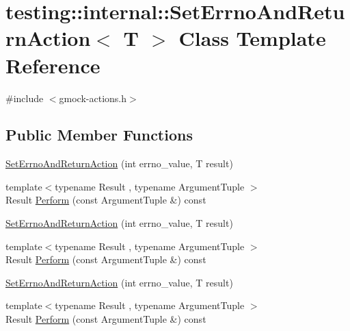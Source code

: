 \hypertarget{classtesting_1_1internal_1_1_set_errno_and_return_action}{}\section{testing\+::internal\+::Set\+Errno\+And\+Return\+Action$<$ T $>$ Class Template Reference}
\label{classtesting_1_1internal_1_1_set_errno_and_return_action}


{\ttfamily \#include $<$gmock-\/actions.\+h$>$}

\subsection*{Public Member Functions}
\begin{DoxyCompactItemize}
\item 
\mbox{\hyperlink{classtesting_1_1internal_1_1_set_errno_and_return_action_abfe5a194a9b8f2b303c635ad99b3a257}{Set\+Errno\+And\+Return\+Action}} (int errno\+\_\+value, T result)
\item 
{\footnotesize template$<$typename Result , typename Argument\+Tuple $>$ }\\Result \mbox{\hyperlink{classtesting_1_1internal_1_1_set_errno_and_return_action_a44025d0d124cab72878bf6bdb12c3693}{Perform}} (const Argument\+Tuple \&) const
\item 
\mbox{\hyperlink{classtesting_1_1internal_1_1_set_errno_and_return_action_abfe5a194a9b8f2b303c635ad99b3a257}{Set\+Errno\+And\+Return\+Action}} (int errno\+\_\+value, T result)
\item 
{\footnotesize template$<$typename Result , typename Argument\+Tuple $>$ }\\Result \mbox{\hyperlink{classtesting_1_1internal_1_1_set_errno_and_return_action_a44025d0d124cab72878bf6bdb12c3693}{Perform}} (const Argument\+Tuple \&) const
\item 
\mbox{\hyperlink{classtesting_1_1internal_1_1_set_errno_and_return_action_abfe5a194a9b8f2b303c635ad99b3a257}{Set\+Errno\+And\+Return\+Action}} (int errno\+\_\+value, T result)
\item 
{\footnotesize template$<$typename Result , typename Argument\+Tuple $>$ }\\Result \mbox{\hyperlink{classtesting_1_1internal_1_1_set_errno_and_return_action_a44025d0d124cab72878bf6bdb12c3693}{Perform}} (const Argument\+Tuple \&) const
\end{DoxyCompactItemize}
